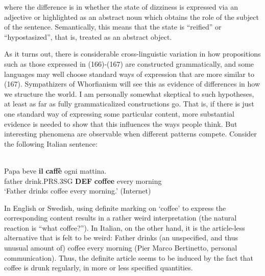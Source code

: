 where the difference is in whether the state of dizziness is expressed via an adjective or highlighted as an abstract noun which obtains the role of the subject of the sentence. Semantically, this means that the state is “reified” or “hypostasized”, that is, treated as an abstract object. 


As it turns out, there is considerable cross-linguistic variation in how propositions such as those expressed in (166){}-(167) are constructed grammatically, and some languages may well choose standard ways of expression that are more similar to (167). Sympathizers of Whorfianism will see this as evidence of differences in how we structure the world. I am personally somewhat skeptical to such hypotheses, at least as far as fully grammaticalized constructions go. That is, if there is just one standard way of expressing some particular content, more substantial evidence is needed to show that this influences the ways people think. But interesting phenomena are observable when different patterns compete. Consider the following Italian sentence:


\ea \label{} 
\\
\gll Papa  beve  \textbf{il} \textbf{caffè} ogni  mattina.\\
father  drink.PRS.3SG  \textbf{DEF} \textbf{coffee} every  morning\\
\glt ‘Father drinks coffee every morning.’ (Internet)

\z

In English or Swedish, using definite marking on ‘coffee’ to express the corresponding content results in a rather weird interpretation (the natural reaction is “what coffee?”). In Italian, on the other hand, it is the article-less alternative that is felt to be weird: Father drinks (an unspecified, and thus unusual amount of) coffee every morning (Pier Marco Bertinetto, personal communication). Thus, the definite article seems to be induced by the fact that coffee is drunk regularly, in more or less specified quantities. 


